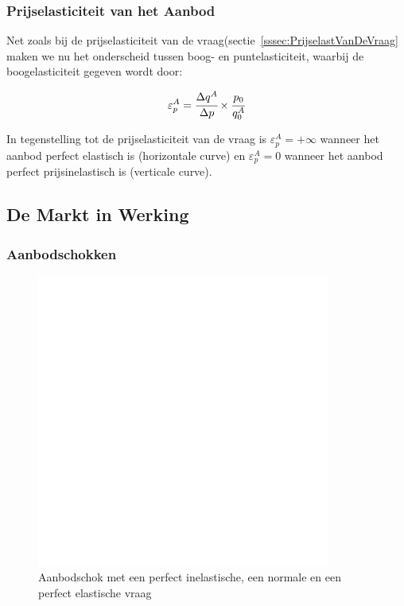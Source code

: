 \subsubsection{Prijselasticiteit van het Aanbod}
Net zoals bij de prijselasticiteit van de vraag(sectie~\ref{sssec:PrijselastVanDeVraag} maken we nu het onderscheid tussen boog- en puntelasticiteit, waarbij de boogelasticiteit gegeven wordt door:

\begin{equation}
	\varepsilon^{A}_{p} =
    \cfrac{\Delta q^A}{\Delta p} \times \cfrac{p_0}{q_{0}^{A}}
\end{equation}

In tegenstelling tot de prijselasticiteit van de vraag is $\varepsilon^{A}_{p} = +\infty$ wanneer het aanbod perfect elastisch is (horizontale curve) en $\varepsilon^{A}_{p} = 0$ wanneer het aanbod perfect prijsinelastisch is (verticale curve).


\subsection{De Markt in Werking}
\subsubsection{Aanbodschokken}
\begin{figure}[htbp]
	\centering
	\includegraphics[scale=0.4]{Images/white.png}
	\caption{Aanbodschok met een perfect inelastische, een normale en een perfect elastische vraag}
	\label{fig:aanbodschok}
\end{figure}

